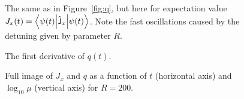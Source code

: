 \documentclass[a4paper,11pt,twoside]{article}
\begin{document}
	\begin{figure}[!h]
        \begin{subfigure}{0.49\linewidth}
            \centering{}
        \end{subfigure}
        \hfill
        \begin{subfigure}{0.49\linewidth}
            \centering{}
        \end{subfigure}
		\caption{The same as in Figure~\ref{fig:q}, but here for expectation value $J_{x}(t)=\left\langle{\psi(t)}\middle|{\mathsf{\hat{J}}_{x}}\middle|{\psi(t)}\right\rangle$.
		Note the fast oscillations caused by the detuning given by parameter $R$.}
		\label{fig:Jx}
	\end{figure}   	

	\begin{figure}[!h]
        \centering{}
		\caption{The first derivative of $q(t)$.}
		\label{fig:qd}
	\end{figure}   	

	\begin{figure}[!h]
        \centering{}
		\caption{Full image of $J_{x}$ and $q$ as a function of $t$ (horizontal axis) and $\log_{10}\mu$ (vertical axis) for $R=200$.}
		\label{fig:fullqJx}
	\end{figure}   	

%
\printbibliography
%
\end{document}
